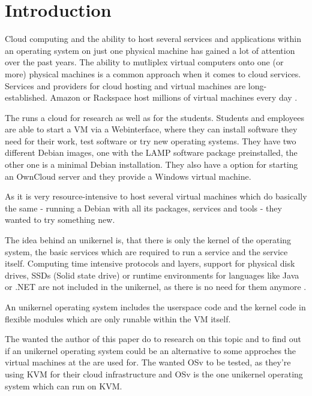 \chapter{Introduction}

    Cloud computing and the ability to host several services and
    applications within an operating system on just one physical machine has
    gained a lot of attention over the past years. The ability to mutliplex
    virtual computers onto one (or more) physical machines is a common approach
    when it comes to cloud services. Services and providers for cloud hosting
    and virtual machines are long-established. Amazon or Rackspace host millions
    of virtual machines every day \cite[S. 1]{unikernels}.

    The \HFU{} runs a cloud for research as well as for the students. Students
    and employees are able to start a VM via a Webinterface, where they can
    install software they need for their work, test software or try new
    operating systems. They have two different Debian images, one with the LAMP
    software package preinstalled, the other one is a minimal Debian
    installation. They also
    have a option for starting an OwnCloud server and they provide a Windows
    virtual machine.

    As it is very resource-intensive to host several virtual machines which do
    basically the same - running a Debian with all its packages, services and
    tools - they wanted to try something new.

    The idea behind an unikernel is, that there is only the kernel of the
    operating system, the basic services which are required to run a service and
    the service itself. Computing time intensive protocols and layers, support
    for physical disk drives, SSDs (Solid state drive) or runtime environments
    for languages like Java or .NET are not included in the unikernel, as there
    is no need for them anymore \cite[S. 1]{unikernels}.

    An unikernel operating system includes the userspace code and the kernel
    code in flexible modules which are only runable within the VM itself.

    The \HFU wanted the author of this paper do to research on this topic and to
    find out if an unikernel operating system could be an alternative to some
    approches the virtual machines at the \HFU are used for. The \HFU wanted OSv
    to be tested, as they're using KVM for their cloud infrastructure and OSv is
    the one unikernel operating system which can run on KVM.
